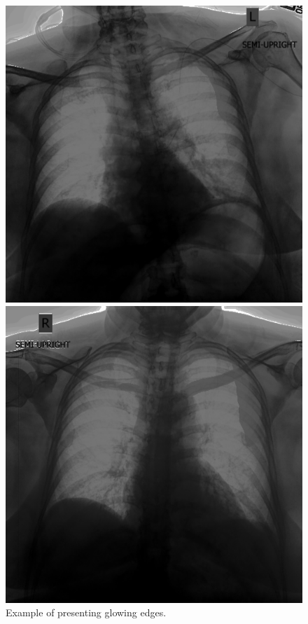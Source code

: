 \documentclass[nomenclature, english, bibtex]{kththesis}
\numberwithin{listing}{chapter}
\begin{document}
\begin{figure}[!tbp]
  \centering
  \begin{minipage}[b]{0.4\textwidth}
    \includegraphics[width=\textwidth]{figures/outline1.png}
  \end{minipage}
  \hfill
  \begin{minipage}[b]{0.4\textwidth}
    \includegraphics[width=\textwidth]{figures/outline2.png}
  \end{minipage}
  \caption{Example of  presenting glowing edges.}
  \label{fig:outlineArtifacts}
\end{figure}
\end{document}
